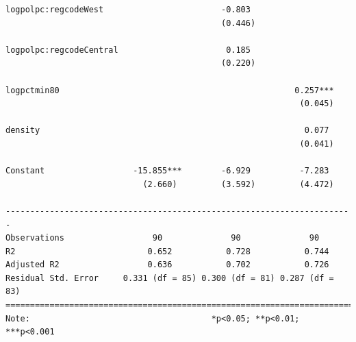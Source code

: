 \documentclass[]{article}
\newenvironment{Shaded}{}{}
\newcommand{\CommentTok}[1]{\textcolor[rgb]{0.00,0.50,0.00}{#1}}
\begin{document}
\begin{verbatim}
logpolpc:regcodeWest                        -0.803                     
                                            (0.446)                    
                                                                       
logpolpc:regcodeCentral                      0.185                     
                                            (0.220)                    
                                                                       
logpctmin80                                                0.257***    
                                                            (0.045)    
                                                                       
density                                                      0.077     
                                                            (0.041)    
                                                                       
Constant                  -15.855***        -6.929          -7.283     
                            (2.660)         (3.592)         (4.472)    
                                                                       
-----------------------------------------------------------------------
Observations                  90              90              90       
R2                           0.652           0.728           0.744     
Adjusted R2                  0.636           0.702           0.726     
Residual Std. Error     0.331 (df = 85) 0.300 (df = 81) 0.287 (df = 83)
=======================================================================
Note:                                     *p<0.05; **p<0.01; ***p<0.001
\end{verbatim}

\begin{Shaded}
\end{Shaded}
\end{document}
